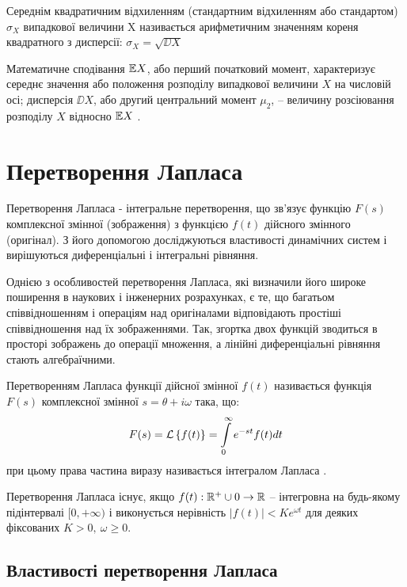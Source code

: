 \begin{defin}
	Середнім квадратичним відхиленням (стандартним відхиленням або стандартом) $\sigma_X$ випадкової величини X називається арифметичним значенням кореня квадратного з дисперсії: $\sigma_X = \sqrt{\DD X}$
\end{defin}

Математичне сподівання $\mathbb{E} X$, або перший початковий момент, характеризує середнє значення або положення розподілу випадкової величини $X$ на числовій осі; дисперсія $\DD X$, або другий центральний момент $\mu_2$, – величину розсіювання розподілу $X$ відносно $\mathbb{E} X$ \cite{Kaniovska}.

\section{Перетворення Лапласа}

Перетворення Лапласа - інтегральне перетворення, що зв'язує функцію $F(s)$ комплексної змінної (зображення) з функцією $f(t)$ дійсного змінного (оригінал). З його допомогою досліджуються властивості динамічних систем і вирішуються диференціальні і інтегральні рівняння.

Однією з особливостей перетворення Лапласа, які визначили його широке поширення в наукових і інженерних розрахунках, є те, що багатьом співвідношенням і операціям над оригіналами відповідають простіші співвідношення над їх зображеннями. Так, згортка двох функцій зводиться в просторі зображень до операції множення, а лінійні диференціальні рівняння стають алгебраїчними.

\begin{defin}
	Перетворенням Лапласа функції дійсної змінної $f(t)$ називається функція $F(s)$ комплексної змінної $s=\theta + i\omega$ така, що:
	\begin{equation}
		F(s)=\mathcal{L}\left\{f(t)\right\}=\int\limits_0^\infty e^{-st} f(t) dt
	\end{equation}
	при цьому права частина виразу називається інтегралом Лапласа \cite{LaplaceWiki}.
\end{defin}

Перетворення Лапласа існує, якщо $f(t): \mathbb{R}^+ \cup {0} \rightarrow \mathbb{R}$ – інтегровна на будь-якому підінтервалі $[0, +\infty)$ і виконується нерівність $|f(t)| < K e^{\omega t}$ для деяких фіксованих $K > 0, ~\omega ≥ 0$.

\subsection{Властивості перетворення Лапласа}

